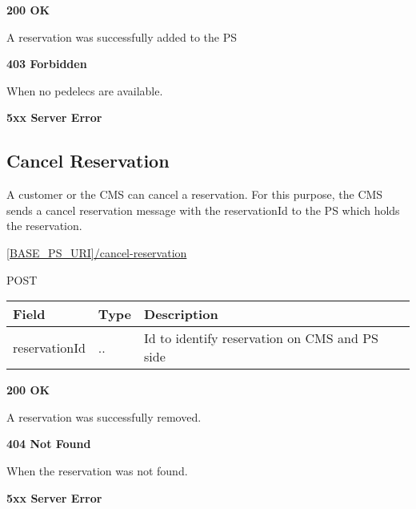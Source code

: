  \textbf{200 OK}

A reservation was successfully added to the \acs{PS}


\textbf{403 Forbidden}

When no pedelecs are available.

\textbf{5xx Server Error}


\subsection{Cancel Reservation}

A customer or the \acs{CMS} can cancel a reservation. For this purpose, the \acs{CMS} sends a cancel reservation message with the reservationId to the \acs{PS} which holds the reservation.

 \url{[BASE_PS_URI]/cancel-reservation}

 POST

\begin{table}[!h]
\vspace{-7mm}
\begin{tabularx}{\linewidth}{ | l | l | X | }
  \hline
  \rowcolor{table-head}
  Field & Type & Description \\
  \hline
  reservationId & .. & Id to identify reservation on \acs{CMS} and \acs{PS} side\\
  \hline
\end{tabularx}
\end{table}

 \textbf{200 OK}

A reservation was successfully removed.


\textbf{404 Not Found}

When the reservation was not found.

\textbf{5xx Server Error}